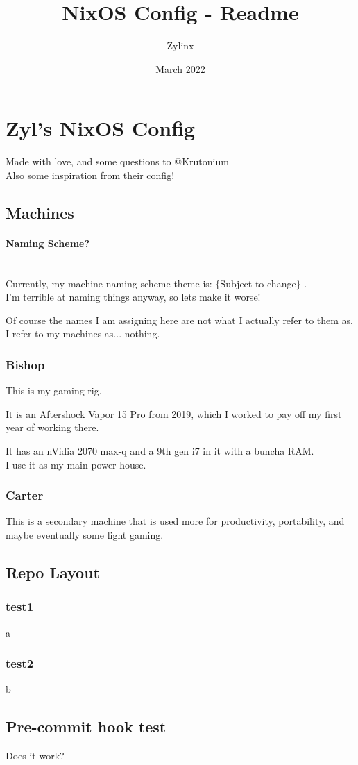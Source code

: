 \documentclass{article}
\title{NixOS Config - Readme}
\author{Zylinx}
\date{March 2022}
\begin{document}
\section{Zyl's NixOS Config}
Made with love, and some questions to @Krutonium\\
Also some inspiration from their config!

\tableofcontents

\subsection{Machines}
\paragraph{Naming Scheme?}\mbox{}\\
Currently, my machine naming scheme theme is: $\{$Subject to change$\}$ .\\
I'm terrible at naming things anyway, so lets make it worse!

Of course the names I am assigning here are not what I actually refer to them as, I refer to my machines as... nothing.

\subsubsection{Bishop}
This is my gaming rig.

It is an Aftershock Vapor 15 Pro from 2019, which I worked to pay off my first year of working there.

It has an nVidia 2070 max-q and a 9th gen i7 in it with a buncha RAM.\\
I use it as my main power house.

\subsubsection{Carter}
This is a secondary machine that is used more for productivity, portability, and maybe eventually some light gaming.

\subsection{Repo Layout}
\subsubsection{test1}
a

\subsubsection{test2}
b

\subsection{Pre-commit hook test}
Does it work?
\end{document}
